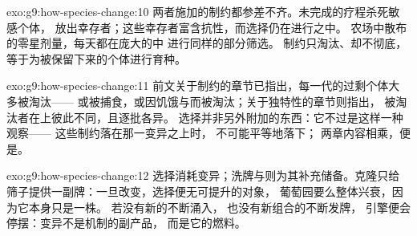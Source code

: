 \begin{solution}{exo:g9:how-species-change:10}
两者施加的制约都参差不齐。未完成的疗程杀死敏感个体，
放出幸存者；这些幸存者富含抗性，而选择仍在进行之中。
农场中散布的零星剂量，每天都在庞大的中
进行同样的部分筛选。
制约只淘汰、却不彻底，
等于为被保留下来的个体进行育种。
\end{solution}

\begin{solution}{exo:g9:how-species-change:11}
前文关于制约的章节已指出，每一代的过剩个体大多被淘汰——
或被捕食，或因饥饿与而被淘汰；关于独特性的章节则指出，
被淘汰者在上彼此不同，且逐批各异。
选择并非另外附加的东西：它不过是这样一种观察——
这些制约落在那一变异之上时，
不可能平等地落下；
两章内容相乘，便是。
\end{solution}

\begin{solution}{exo:g9:how-species-change:12}
选择消耗变异；洗牌与则为其补充储备。克隆只给
筛子提供一副牌：一旦改变，选择便无可提升的对象，
葡萄园要么整体兴衰，因为它本身只是一株。
若没有新的不断涌入，
也没有新组合的不断发牌，
引擎便会停摆：变异不是机制的副产品，
而是它的燃料。
\end{solution}

